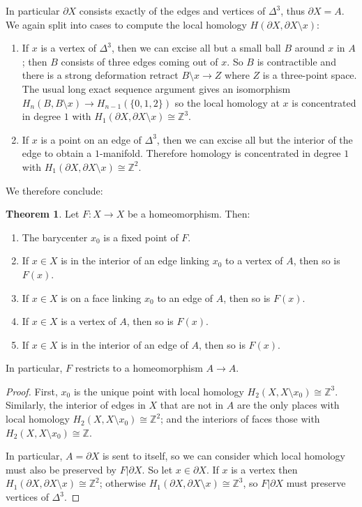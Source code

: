 \documentclass[10pt]{article}
\newcommand{\ZZ}{\mathbb{Z}}
\theoremstyle{definition}
\newtheorem{theorem}[lemma]{Theorem}
\begin{document}
In particular $\partial X$ consists exactly of the edges and vertices of $\Delta^3$, thus $\partial X = A$.
We again split into cases to compute the local homology $H(\partial X, \partial X \setminus x)$:
\begin{enumerate}
\item If $x$ is a vertex of $\Delta^3$, then we can excise all but a small ball $B$ around $x$ in $A$; then $B$ consists of three edges coming out of $x$.
So $B$ is contractible and there is a strong deformation retract $B \setminus x \to Z$ where $Z$ is a three-point space.
The usual long exact sequence argument gives an isomorphism $H_n(B, B \setminus x) \to H_{n-1}(\{0, 1, 2\})$ so the local homology at $x$ is concentrated in degree $1$ with $H_1(\partial X, \partial X \setminus x) \cong \ZZ^3$.
\item If $x$ is a point on an edge of $\Delta^3$, then we can excise all but the interior of the edge to obtain a $1$-manifold. Therefore homology is concentrated in degree $1$ with $H_1(\partial X, \partial X \setminus x) \cong \ZZ^2$.
\end{enumerate}

We therefore conclude:
\begin{theorem}
Let $F: X \to X$ be a homeomorphism. Then:
\begin{enumerate}
\item The barycenter $x_0$ is a fixed point of $F$.
\item If $x \in X$ is in the interior of an edge linking $x_0$ to a vertex of $A$, then so is $F(x)$.
\item If $x \in X$ is on a face linking $x_0$ to an edge of $A$, then so is $F(x)$.
\item If $x \in X$ is a vertex of $A$, then so is $F(x)$.
\item If $x \in X$ is in the interior of an edge of $A$, then so is $F(x)$.
\end{enumerate}
In particular, $F$ restricts to a homeomorphism $A \to A$.
\end{theorem}
\begin{proof}
First, $x_0$ is the unique point with local homology $H_2(X, X \setminus x_0) \cong \ZZ^3$. Similarly, the interior of edges in $X$ that are not in $A$ are the only places with local homology $H_2(X, X \setminus x_0) \cong \ZZ^2$; and the interiors of faces those with $H_2(X, X \setminus x_0) \cong \ZZ$.

In particular, $A = \partial X$ is sent to itself, so we can consider which local homology must also be preserved by $F|\partial X$.
So let $x \in \partial X$.
If $x$ is a vertex then $H_1(\partial X, \partial X \setminus x) \cong \ZZ^2$; otherwise $H_1(\partial X, \partial X \setminus x) \cong \ZZ^3$, so $F|\partial X$ must preserve vertices of $\Delta^3$.
\end{proof}
\end{document}
